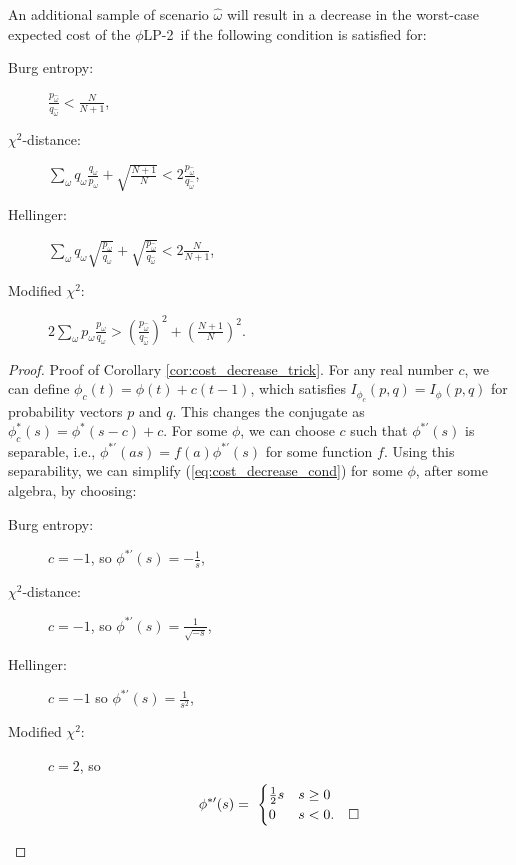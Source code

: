 \documentclass[opre,nonblindrev]{informs3} %
\newcommand{\plp}{$\phi$LP-2}
\begin{document}
\begin{corollary}
	\label{cor:cost_decrease_trick}
	An additional sample of scenario $\hat{\omega}$ will result in a decrease in the worst-case expected cost of the \plp\ if the following condition is satisfied for:\vspace*{-0.1in}
	\begin{multicols}{2}
		\begin{description}
			\item[Burg entropy:] $\frac{p_{\hat{\omega}}}{q_{\hat{\omega}}} < \frac{N}{N+1}$, %
			\item[$\chi^2$-distance:]  $\sum_\omega q_\omega \frac{q_\omega}{p_\omega} + \sqrt{\frac{N+1}{N}} < 2 \frac{p_{\hat{\omega}}}{q_{\hat{\omega}}}$,
			\item[Hellinger:] $\sum_\omega q_\omega \sqrt{\frac{p_\omega}{q_\omega}} + \sqrt{\frac{p_{\hat{\omega}}}{q_{\hat{\omega}}}} < 2 \frac{N}{N+1}$,
			\item[Modified $\chi^2$:] $2 \sum_\omega p_\omega \frac{p_\omega}{q_\omega} > \left(\frac{p_{\hat{\omega}}}{q_{\hat{\omega}}}\right)^2 + \left(\frac{N+1}{N}\right)^2$.
		\end{description}
	\end{multicols}
\end{corollary}

\begin{proof}{\sc Proof of Corollary \ref{cor:cost_decrease_trick}.}
	For any real number $c$, we can define $\phi_c(t) = \phi(t) + c(t-1)$, which satisfies $I_{\phi_c}(p,q) = I_\phi(p,q)$ for probability vectors $p$ and $q$.
	This changes the conjugate as $\phi_c^*(s) = \phi^*(s-c) + c$.
	For some $\phi$, we can choose $c$ such that $\phi^{*\prime}(s)$ is separable, i.e., $\phi^{*\prime}(as) = f(a) \phi^{*\prime}(s)$ for some function $f$.
	Using this separability, we can simplify (\ref{eq:cost_decrease_cond}) for some $\phi$, after some algebra, by choosing:\vspace*{-0.15in}
	\begin{multicols}{2}
	\begin{description} 
		\item[Burg entropy:]  $c = -1$, so $\phi^{*\prime}(s) = -\frac{1}{s}$,
		\item[$\chi^2$-distance:] $c = -1$, so $\phi^{*\prime}(s) = \frac{1}{\sqrt{-s}}$,
		\item[Hellinger:]  $c = -1$ so $\phi^{*\prime}(s) = \frac{1}{s^2}$, 
		\item[Modified $\chi^2$:] $c = 2$, so
		\[
			\phi^{*\prime}(s) = \
			\begin{cases}
				\frac{1}{2} s & s \geq 0 \\
				0 & s < 0.   \mbox{\quad$\square$}
			\end{cases}
		\]
	\end{description}
	\end{multicols}
\end{proof}
\end{document}
